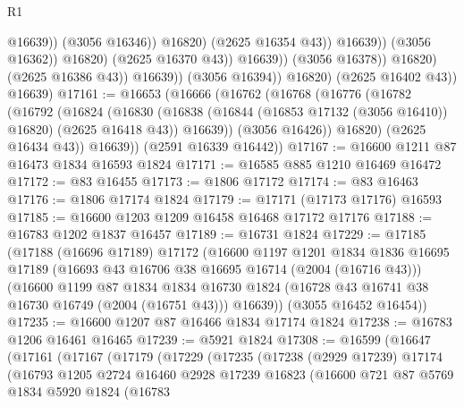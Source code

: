 \begin{lexlean}{R1}
\begin{coremodule}
                                              @16639))
                                          (@3056 @16346))
                                        @16820)
                                      (@2625 @16354 @43))
                                    @16639))
                                (@3056 @16362))
                              @16820)
                            (@2625 @16370 @43))
                          @16639))
                      (@3056 @16378))
                    @16820)
                  (@2625 @16386 @43))
                @16639))
            (@3056 @16394))
          @16820)
        (@2625 @16402 @43))
      @16639)
@17161 := @16653
    (@16666
      (@16762
        (@16768
          (@16776
            (@16782
              (@16792
                (@16824
                  (@16830
                    (@16838 (@16844 (@16853 @17132 (@3056 @16410)) @16820) (@2625 @16418 @43))
                    @16639))
                (@3056 @16426))
              @16820)
            (@2625 @16434 @43))
          @16639))
      (@2591 @16339 @16442))
@17167 := @16600 @1211 @87 @16473 @1834 @16593 @1824
@17171 := @16585 @885 @1210 @16469 @16472
@17172 := @83 @16455
@17173 := @1806 @17172
@17174 := @83 @16463
@17176 := @1806 @17174 @1824
@17179 := @17171 (@17173 @17176) @16593
@17185 := @16600 @1203 @1209 @16458 @16468 @17172 @17176
@17188 := @16783 @1202 @1837 @16457
@17189 := @16731 @1824
@17229 := @17185
    (@17188
      (@16696 @17189)
      @17172
      (@16600
        @1197
        @1201
        @1834
        @1836
        @16695
        @17189
        (@16693 @43 @16706 @38 @16695 @16714 (@2004 (@16716 @43)))
        (@16600
          @1199
          @87
          @1834
          @1834
          @16730
          @1824
          (@16728 @43 @16741 @38 @16730 @16749 (@2004 (@16751 @43)))
          @16639))
      (@3055 @16452 @16454))
@17235 := @16600 @1207 @87 @16466 @1834 @17174 @1824
@17238 := @16783 @1206 @16461 @16465
@17239 := @5921 @1824
@17308 := @16599
    (@16647
      (@17161
        (@17167
          (@17179
            (@17229
              (@17235
                (@17238
                  (@2929 @17239)
                  @17174
                  (@16793
                    @1205
                    @2724
                    @16460
                    @2928
                    @17239
                    @16823
                    (@16600
                      @721
                      @87
                      @5769
                      @1834
                      @5920
                      @1824
                      (@16783

\end{coremodule}
\end{lexlean}

